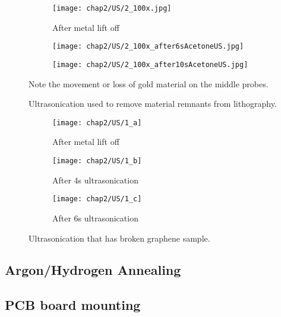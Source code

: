 \documentclass[../../Matt_Gebert_Honours_Thesis.tex]{subfiles}
\begin{document}
	\begin{figure}[H]
		\centering
		\begin{subfigure}[b]{0.3\textwidth}
			\texttt{[image: chap2/US/2\_100x.jpg]}
			\caption{After metal lift off}			
		\end{subfigure}
		\begin{subfigure}[b]{0.3\textwidth}
			\texttt{[image: chap2/US/2\_100x\_after6sAcetoneUS.jpg]}
		\end{subfigure}
		\begin{subfigure}[b]{0.3\textwidth}
			\texttt{[image: chap2/US/2\_100x\_after10sAcetoneUS.jpg]}
		\end{subfigure}
		\caption{Ultrasonication used to remove material remnants from lithography.}\label{fig:lithography_skins_us}Note the movement or loss of gold material on the middle probes.
	\end{figure}
	
	\begin{figure}[H]
		\centering
		\begin{subfigure}[b]{0.3\textwidth}
			\texttt{[image: chap2/US/1\_a]}
			\caption{After metal lift off}
		\end{subfigure}
		\begin{subfigure}[b]{0.3\textwidth}
			\texttt{[image: chap2/US/1\_b]}
			\caption{After 4s ultrasonication}
		\end{subfigure}
		\begin{subfigure}[b]{0.3\textwidth}
			\texttt{[image: chap2/US/1\_c]}
			\caption{After 6s ultrasonication}
		\end{subfigure}
		\caption{Ultrasonication that has broken graphene sample.}\label{fig:lithography_skins_break}
	\end{figure}

	\subsection{Argon/Hydrogen Annealing}\label{sec:annealing}

	\subsection{PCB board mounting}\label{sec:pcb}
\end{document}
